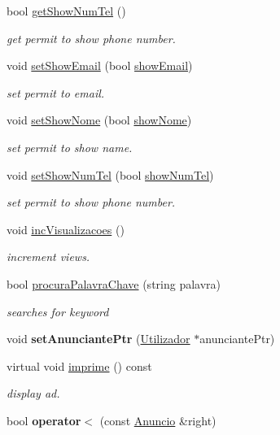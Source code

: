 \begin{DoxyCompactItemize}
bool \hyperlink{class_anuncio_abdb5d05590af7478014e1cd797321102}{get\+Show\+Num\+Tel} ()
\begin{DoxyCompactList}\small\item\em get permit to show phone number. \end{DoxyCompactList}\item 
void \hyperlink{class_anuncio_ace8d5fa8aa3d46a300a7102868a7bf95}{set\+Show\+Email} (bool \hyperlink{class_anuncio_a6a41218c0a11ba393522d3a9a80ded95}{show\+Email})
\begin{DoxyCompactList}\small\item\em set permit to email. \end{DoxyCompactList}\item 
void \hyperlink{class_anuncio_af5bb5ebb03c2de5ae976a109ff5eac4b}{set\+Show\+Nome} (bool \hyperlink{class_anuncio_a50feea41d2253cd5168243b18fa03aa6}{show\+Nome})
\begin{DoxyCompactList}\small\item\em set permit to show name. \end{DoxyCompactList}\item 
void \hyperlink{class_anuncio_a30d13de6f44e98e6a49d11cd8c1d113a}{set\+Show\+Num\+Tel} (bool \hyperlink{class_anuncio_a8db5dc7339e63974c643a6602f2cf7bc}{show\+Num\+Tel})
\begin{DoxyCompactList}\small\item\em set permit to show phone number. \end{DoxyCompactList}\item 
void \hyperlink{class_anuncio_a7e86d76da13004991f968c7f13658709}{inc\+Visualizacoes} ()
\begin{DoxyCompactList}\small\item\em increment views. \end{DoxyCompactList}\item 
bool \hyperlink{class_anuncio_ae5cc9e673ffdeaf375549abf57007520}{procura\+Palavra\+Chave} (string palavra)
\begin{DoxyCompactList}\small\item\em searches for keyword \end{DoxyCompactList}\item 
\hypertarget{class_anuncio_a664d6ed6559ad6ef101841f591f1a76a}{}void {\bfseries set\+Anunciante\+Ptr} (\hyperlink{class_utilizador}{Utilizador} $\ast$anunciante\+Ptr)\label{class_anuncio_a664d6ed6559ad6ef101841f591f1a76a}

\item 
virtual void \hyperlink{class_anuncio_a22ca83f9eb721f4dc20dcbe952d29166}{imprime} () const 
\begin{DoxyCompactList}\small\item\em display ad. \end{DoxyCompactList}\item 
\hypertarget{class_anuncio_a66db5a1085db5f16f2130d4475044277}{}bool {\bfseries operator$<$} (const \hyperlink{class_anuncio}{Anuncio} \&right)\label{class_anuncio_a66db5a1085db5f16f2130d4475044277}

\end{DoxyCompactItemize}
